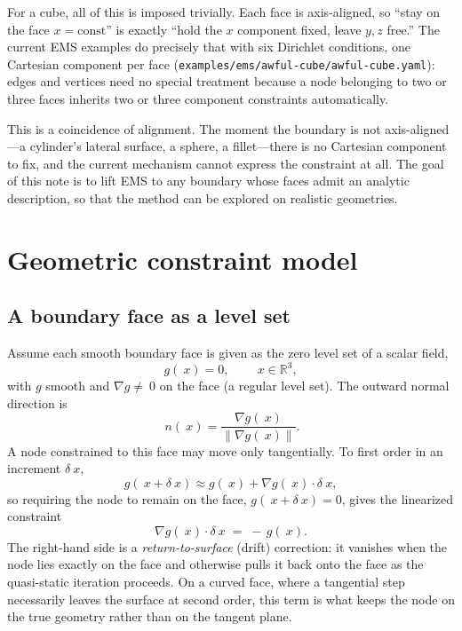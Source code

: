 \documentclass[11pt]{article}
\newcommand{\grad}{\nabla}
\newcommand{\Real}{\mathbb{R}}
\newcommand{\norm}[1]{\lVert #1 \rVert}
\newcommand{\code}[1]{\texttt{#1}}
\begin{document}
For a cube, all of this is imposed trivially. Each face is axis-aligned, so
``stay on the face $x=\text{const}$'' is exactly ``hold the $x$ component
fixed, leave $y,z$ free.'' The current EMS examples do precisely that with six
Dirichlet conditions, one Cartesian component per face
(\code{examples/\allowbreak ems/\allowbreak awful-cube/\allowbreak awful-cube.yaml}):
edges and vertices need no special treatment because a node belonging to two or
three faces inherits two or three component constraints automatically.

This is a coincidence of alignment. The moment the boundary is not
axis-aligned---a cylinder's lateral surface, a sphere, a fillet---there is no
Cartesian component to fix, and the current mechanism cannot express the
constraint at all. The goal of this note is to lift EMS to any boundary whose
faces admit an analytic description, so that the method can be explored on
realistic geometries.

\section{Geometric constraint model}
\label{sec:model}

\subsection{A boundary face as a level set}

Assume each smooth boundary face is given as the zero level set of a scalar
field,
\begin{equation}
  g(~x) = 0, \qquad ~x \in \Real^3,
  \label{eq:levelset}
\end{equation}
with $g$ smooth and $\grad g \ne ~0$ on the face (a regular level set). The
outward normal direction is
\begin{equation}
  ~n(~x) = \frac{\grad g(~x)}{\norm{\grad g(~x)}}.
  \label{eq:normal}
\end{equation}
A node constrained to this face may move only tangentially. To first order in
an increment $\delta~x$,
\begin{equation}
  g(~x + \delta~x) \approx g(~x) + \grad g(~x)\cdot\delta~x,
\end{equation}
so requiring the node to remain on the face, $g(~x+\delta~x)=0$, gives the
linearized constraint
\begin{equation}
  \grad g(~x)\cdot\delta~x \;=\; -\,g(~x).
  \label{eq:linconstraint}
\end{equation}
The right-hand side is a \emph{return-to-surface} (drift) correction: it
vanishes when the node lies exactly on the face and otherwise pulls it back
onto the face as the quasi-static iteration proceeds. On a curved face, where a
tangential step necessarily leaves the surface at second order, this term is
what keeps the node on the true geometry rather than on the tangent plane.
\end{document}
